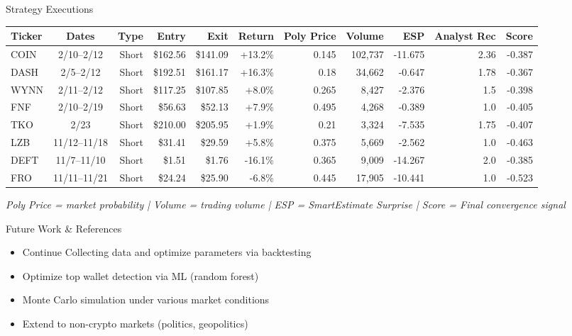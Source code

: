 \documentclass[final]{beamer}
\newlength{\colwidth}
\begin{document}
\begin{frame}[t]
\begin{columns}[t]
\begin{column}{\colwidth}
  \begin{block}{Strategy Executions}
    \footnotesize
    \begin{table}
      \centering
      \begin{tabular}{l c r r r r r r r r r}
        \toprule
        \textbf{Ticker} & \textbf{Dates} & \textbf{Type} & \textbf{Entry} & \textbf{Exit} & \textbf{Return} & \textbf{Poly Price} & \textbf{Volume} & \textbf{ESP} & \textbf{Analyst Rec} & \textbf{Score} \\
        \midrule
        COIN & 2/10--2/12 & Short & \$162.56 & \$141.09 & +13.2\% & 0.145 & 102,737 & -11.675 & 2.36 & -0.387 \\
        DASH & 2/5--2/12 & Short & \$192.51 & \$161.17 & +16.3\% & 0.18 & 34,662 & -0.647 & 1.78 & -0.367 \\
        WYNN & 2/11--2/12 & Short & \$117.25 & \$107.85 & +8.0\% & 0.265 & 8,427 & -2.376 & 1.5 & -0.398 \\
        FNF & 2/10--2/19 & Short & \$56.63 & \$52.13 & +7.9\% & 0.495 & 4,268 & -0.389 & 1.0 & -0.405 \\
        TKO & 2/23 & Short & \$210.00 & \$205.95 & +1.9\% & 0.21 & 3,324 & -7.535 & 1.75 & -0.407 \\
        LZB & 11/12--11/18 & Short & \$31.41 & \$29.59 & +5.8\% & 0.375 & 5,669 & -2.562 & 1.0 & -0.463 \\
        DEFT & 11/7--11/10 & Short & \$1.51 & \$1.76 & -16.1\% & 0.365 & 9,009 & -14.267 & 2.0 & -0.385 \\
        FRO & 11/11--11/21 & Short & \$24.24 & \$25.90 & -6.8\% & 0.445 & 17,905 & -10.441 & 1.0 & -0.523 \\
        \bottomrule
      \end{tabular}
    \end{table}
    \vspace{0.05cm}
    \footnotesize{\textit{Poly Price = market probability | Volume = trading volume | ESP = SmartEstimate Surprise | Score = Final convergence signal}}
  \end{block}

  \begin{block}{Future Work \& References}

    \small
    \begin{itemize}
      \setlength{\itemsep}{2pt}\setlength{\parsep}{0pt}

      \item Continue Collecting data and optimize parameters via backtesting 
      \item Optimize top wallet detection via ML (random forest)
      \item Monte Carlo simulation under various market conditions
      \item Extend to non-crypto markets (politics, geopolitics)
    \end{itemize}


\end{block}
\end{column}
\end{columns}
\end{frame}
\end{document}
